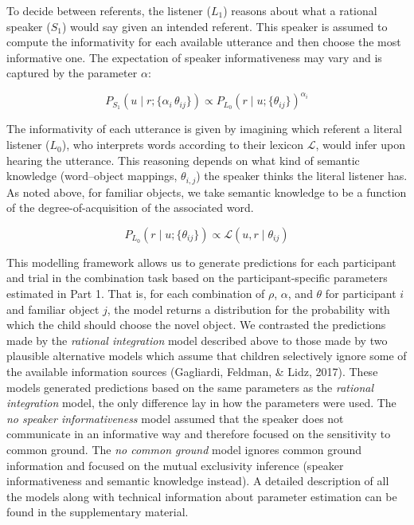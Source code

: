 \documentclass[
  man,floatsintext]{apa6}
\begin{document}
To decide between referents, the listener (\(L_1\)) reasons about what a rational speaker (\(S_1\)) would say given an intended referent. This speaker is assumed to compute the informativity for each available utterance and then choose the most informative one. The expectation of speaker informativeness may vary and is captured by the parameter \(\alpha\):

\begin{equation}
P_{S_1}(u \mid r; \{\alpha_i\, \theta_{ij}\})\propto P_{L_0}(r \mid u; \{\theta_{ij}\}) ^{\alpha_i}
\label{eq:rsafull2}
\end{equation}

The informativity of each utterance is given by imagining which referent a literal listener (\(L_0\)), who interprets words according to their lexicon \(\mathcal{L}\), would infer upon hearing the utterance. This reasoning depends on what kind of semantic knowledge (word--object mappings, \(\theta_{i,j}\)) the speaker thinks the literal listener has. As noted above, for familiar objects, we take semantic knowledge to be a function of the degree-of-acquisition of the associated word.

\begin{equation}
P_{L_0}(r \mid u; \{\theta_{ij}\}) \propto \mathcal{L}(u, r \mid \theta_{ij})
\label{eq:rsafull3}
\end{equation}

This modelling framework allows us to generate predictions for each participant and trial in the combination task based on the participant-specific parameters estimated in Part 1. That is, for each combination of \(\rho\), \(\alpha\), and \(\theta\) for participant \(i\) and familiar object \(j\), the model returns a distribution for the probability with which the child should choose the novel object. We contrasted the predictions made by the \emph{rational integration} model described above to those made by two plausible alternative models which assume that children selectively ignore some of the available information sources (Gagliardi, Feldman, \& Lidz, 2017). These models generated predictions based on the same parameters as the \emph{rational integration} model, the only difference lay in how the parameters were used. The \emph{no speaker informativeness} model assumed that the speaker does not communicate in an informative way and therefore focused on the sensitivity to common ground. The \emph{no common ground} model ignores common ground information and focused on the mutual exclusivity inference (speaker informativeness and semantic knowledge instead). A detailed description of all the models along with technical information about parameter estimation can be found in the supplementary material.
\end{document}
